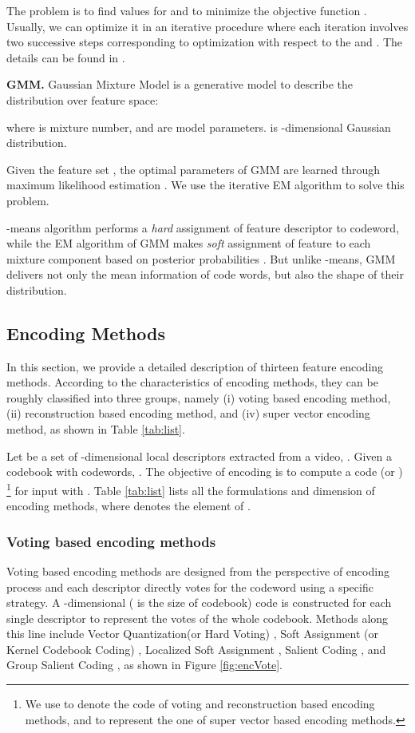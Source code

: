 \documentclass[twocolumn]{svjour3}          \smartqed  \usepackage{slashbox}
\begin{document}
The problem is to find values for  and  to minimize the objective function . Usually,  we can optimize it in an iterative procedure where each iteration involves two successive steps corresponding to optimization with respect to the  and . The details can be found in \cite{Bishop06}.

\textbf{GMM.} Gaussian Mixture Model is a generative model to describe the distribution over feature space:

where  is mixture number, and   are model parameters.  is -dimensional Gaussian distribution.

Given the feature set , the optimal parameters of GMM are learned through maximum likelihood estimation . We use the iterative EM algorithm \cite{Bishop06} to solve this problem.

-means algorithm performs a \emph{hard} assignment of feature descriptor to codeword, while the EM algorithm of GMM makes \emph{soft} assignment of feature to each mixture component based on  posterior probabilities . But unlike -means, GMM delivers not only the mean information of code words, but also the shape of their distribution.

\subsection{Encoding Methods}
In this section, we provide a detailed description of thirteen feature encoding methods. According to the characteristics of encoding methods, they can be roughly classified into three groups, namely (i) voting based encoding method, (ii) reconstruction based encoding method, and (iv) super vector encoding method, as shown in Table \ref{tab:list}.

Let  be a set of -dimensional local descriptors extracted from a video, . Given a codebook with  codewords, . The objective of encoding is to compute a code  (or ) \footnote{We use  to denote the code of voting and reconstruction based encoding methods, and  to represent the one of super vector based encoding methods.} for input  with . Table \ref{tab:list} lists all the formulations and dimension of encoding methods, where  denotes the  element of .

\subsubsection{Voting based encoding methods}
Voting based encoding methods \cite{SivicZ03,GemertVSG10,LiuWL11,HuangHYT11,WuHWT12} are designed from the perspective of encoding process and each descriptor directly votes for the codeword using a specific strategy. A -dimensional ( is the size of codebook) code  is constructed for each single descriptor to represent the votes of the whole codebook. Methods along this line include Vector Quantization(or Hard Voting) \cite{SivicZ03}, Soft Assignment (or Kernel Codebook Coding) \cite{GemertVSG10}, Localized Soft Assignment \cite{LiuWL11}, Salient Coding \cite{HuangHYT11}, and Group Salient Coding \cite{WuHWT12}, as shown in Figure \ref{fig:encVote}.
\end{document}

